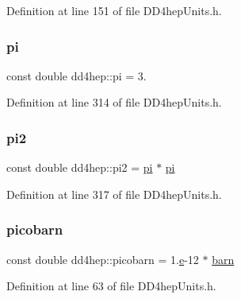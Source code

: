Definition at line 151 of file D\+D4hep\+Units.\+h.

\hypertarget{namespacedd4hep_ae71f82066d68af053eb8f60d0e13d3af}{}\label{namespacedd4hep_ae71f82066d68af053eb8f60d0e13d3af} 
\subsubsection{\texorpdfstring{pi}{pi}}
{\footnotesize\ttfamily const double dd4hep\+::pi = 3.\hspace{0.3cm}{\ttfamily [static]}}



Definition at line 314 of file D\+D4hep\+Units.\+h.

\hypertarget{namespacedd4hep_a5cf56ca6631717191746c4f24418d5f3}{}\label{namespacedd4hep_a5cf56ca6631717191746c4f24418d5f3} 
\subsubsection{\texorpdfstring{pi2}{pi2}}
{\footnotesize\ttfamily const double dd4hep\+::pi2 = \hyperlink{namespacedd4hep_ae71f82066d68af053eb8f60d0e13d3af}{pi} $\ast$ \hyperlink{namespacedd4hep_ae71f82066d68af053eb8f60d0e13d3af}{pi}\hspace{0.3cm}{\ttfamily [static]}}



Definition at line 317 of file D\+D4hep\+Units.\+h.

\hypertarget{namespacedd4hep_a5b0a18e0239e264a79ce5e86724a0068}{}\label{namespacedd4hep_a5b0a18e0239e264a79ce5e86724a0068} 
\subsubsection{\texorpdfstring{picobarn}{picobarn}}
{\footnotesize\ttfamily const double dd4hep\+::picobarn = 1.\hyperlink{_volumes_8cpp_a8a9a1f93e9b09afccaec215310e64142}{e}-\/12 $\ast$ \hyperlink{namespacedd4hep_a561a205dfb5e2f3151e032ad640f1d35}{barn}\hspace{0.3cm}{\ttfamily [static]}}



Definition at line 63 of file D\+D4hep\+Units.\+h.

\hypertarget{namespacedd4hep_a1e21414355b7fcaa8bfe810bb0de69a9}{}\label{namespacedd4hep_a1e21414355b7fcaa8bfe810bb0de69a9} 

